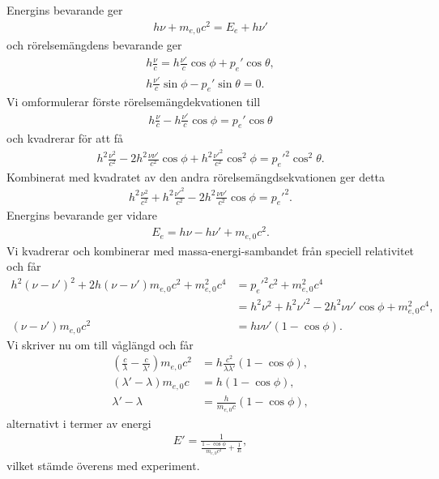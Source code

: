 Energins bevarande ger
\begin{align*}
	h\nu + m_{e, 0}c^{2} = E_{e} + h\nu'
\end{align*}
och rörelsemängdens bevarande ger
\begin{align*}
	h\frac{\nu}{c} = h\frac{\nu'}{c}\cos{\phi} + p_{e}'\cos{\theta}, \\
	h\frac{\nu'}{c}\sin{\phi} - p_{e}'\sin{\theta} = 0.
\end{align*}
Vi omformulerar förste rörelsemängdekvationen till
\begin{align*}
	h\frac{\nu}{c} - h\frac{\nu'}{c}\cos{\phi} = p_{e}'\cos{\theta}
\end{align*}
och kvadrerar för att få
\begin{align*}
	h^{2}\frac{\nu^{2}}{c^{2}} - 2h^{2}\frac{\nu\nu'}{c^{2}}\cos{\phi} + h^{2}\frac{\nu'^{2}}{c^{2}}\cos^{2}{\phi} = p_{e}'^{2}\cos^{2}{\theta}.
\end{align*}
Kombinerat med kvadratet av den andra rörelsemängdsekvationen ger detta
\begin{align*}
	h^{2}\frac{\nu^{2}}{c^{2}} + h^{2}\frac{\nu'^{2}}{c^{2}} - 2h^{2}\frac{\nu\nu'}{c^{2}}\cos{\phi} = p_{e}'^{2}.
\end{align*}
Energins bevarande ger vidare
\begin{align*}
	E_{e} = h\nu - h\nu' + m_{e, 0}c^{2}.
\end{align*}
Vi kvadrerar och kombinerar med massa-energi-sambandet från speciell relativitet och får
\begin{align*}
	h^{2}(\nu - \nu')^{2} + 2h(\nu - \nu')m_{e, 0}c^{2} + m_{e, 0}^{2}c^{4} &= p_{e}'^{2}c^{2} + m_{e, 0}^{2}c^{4} \\
	                                                                        &= h^{2}\nu^{2} + h^{2}\nu'^{2} - 2h^{2}\nu\nu'\cos{\phi} + m_{e, 0}^{2}c^{4}, \\
	(\nu - \nu')m_{e, 0}c^{2}                                               &= h\nu\nu'(1 - \cos{\phi}).
\end{align*}
Vi skriver nu om till våglängd och får
\begin{align*}
	(\frac{c}{\lambda} - \frac{c}{\lambda'})m_{e, 0}c^{2} &= h\frac{c^{2}}{\lambda\lambda'}(1 - \cos{\phi}), \\
	(\lambda' - \lambda)m_{e, 0}c                         &= h(1 - \cos{\phi}), \\
	\lambda' - \lambda                                    &= \frac{h}{m_{e, 0}c}(1 - \cos{\phi}),
\end{align*}
alternativt i termer av energi
\begin{align*}
	E' = \frac{1}{\frac{1 - \cos{\phi}}{m_{e, 0}c^{2}} + \frac{1}{E}},
\end{align*}
vilket stämde överens med experiment.


